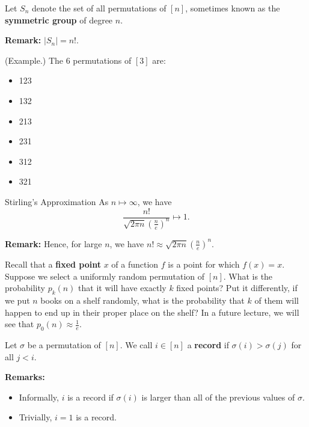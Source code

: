\documentclass[letterpaper]{article}
\begin{document}
\begin{definition}{}{}
    Let $S_n$ denote the set of all permutations of $[n]$, sometimes known as the \textbf{symmetric group} of degree $n$.
\end{definition}
\textbf{Remark:} $|S_n| = n!$.

\begin{mdframed}[]
    (Example.) The 6 permutations of $[3]$ are: 
    \begin{itemize}
        \item 123
        \item 132
        \item 213
        \item 231
        \item 312
        \item 321
    \end{itemize}
\end{mdframed}

\begin{theorem}{Stirling's Approximation}{}
    As $n \mapsto \infty$, we have 
    \[\frac{n!}{\sqrt{2\pi n} \left(\frac{n}{e}\right)^n} \mapsto 1.\]
\end{theorem}
\textbf{Remark:} Hence, for large $n$, we have $n! \approx \sqrt{2\pi n} \left(\frac{n}{e}\right)^n$. 

\bigskip 

Recall that a \textbf{fixed point} $x$ of a function $f$ is a point for which $f(x) = x$. Suppose we select a uniformly random permutation of $[n]$. What is the probability $p_{k}(n)$ that it will have exactly $k$ fixed points? Put it differently, if we put $n$ books on a shelf randomly, what is the probability that $k$ of them will happen to end up in their proper place on the shelf? In a future lecture, we will see that $p_{0}(n) \approx \frac{1}{e}$. 

\bigskip 

\begin{definition}{}{}
    Let $\sigma$ be a permutation of $[n]$. We call $i \in [n]$ a \textbf{record} if $\sigma(i) > \sigma(j)$ for all $j < i$. 
\end{definition}
\textbf{Remarks:}
\begin{itemize}
    \item Informally, $i$ is a record if $\sigma(i)$ is larger than all of the previous values of $\sigma$. 
    \item Trivially, $i = 1$ is a record.
\end{itemize}
\end{document}
